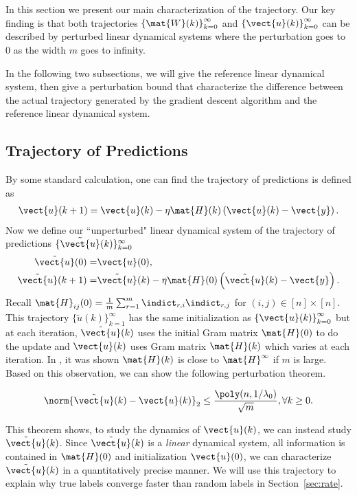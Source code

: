 In this section we present our main characterization of the trajectory.
Our key finding is that both trajectories $\left\{\mat{W}(k)\right\}_{k=0}^\infty$ and $\left\{\vect{u}(k)\right\}_{k=0}^\infty$ can be described by perturbed linear dynamical systems where the perturbation goes to $0$ as the width $m$ goes to infinity.

In the following two subsections, we will give the reference linear dynamical system, then give a perturbation bound that characterize the difference between the actual trajectory generated by the gradient descent algorithm and the reference linear dynamical system.

\subsection{Trajectory of Predictions}
\label{sec:traj_pred}
By some standard calculation, one can find the trajectory of predictions is defined as 
\begin{align*}
	\vect{u}(k+1) = \vect{u}(k) - \eta \mat{H}(k)\left(\vect{u}(k)-\vect{y}\right).
\end{align*}
Now we define our ``unperturbed" linear dynamical system of the trajectory of predictions $\{\tilde{\vect{u}}(k)\}_{k=0}^\infty$
\begin{align}
	\tilde{\vect{u}}(0) = &\vect{u}(0), \nonumber\\
	\tilde{\vect{u}}(k+1) = &\tilde{\vect{u}}(k) - \eta \mat{H}(0)\left(\tilde{\vect{u}}(k)-\vect{y}\right). \label{eqn:u_tilde_dynamics}
\end{align}
Recall $\mat{H}_{ij}(0) = \frac{1}{m}\sum_{r=1}^{m} \indict_{r,i}\indict_{r,j}$ for $(i,j) \in [n] \times [n]$.
This trajectory $\{\tilde{u}(k)\}_{k=1}^{\infty}$ has the same initialization as $\left\{\vect{u}(k)\right\}_{k=0}^\infty$ but at each iteration, $\tilde{\vect{u}}(k)$ uses the initial Gram matrix $\mat{H}(0)$ to do the update and $\vect{u}(k)$ uses Gram matrix $\mat{H}(k)$ which varies at each iteration.
In \cite{du2018provably}, it was shown $\mat{H}(k)$ is close to $\mat{H}^\infty$ if $m$ is large.
Based on this observation, we can show the following perturbation theorem.
\begin{thm}\label{thm:traj_u}
\begin{align}
\norm{\tilde{\vect{u}}(k) - \vect{u}(k)}_2 \le \frac{\poly(n,1/\lambda_0)}{\sqrt{m}}, \forall k \ge 0. \label{eqn:traj_u_perturb}
\end{align}
\end{thm}
This theorem shows, to study the dynamics of $\vect{u}(k)$, we can instead study $\tilde{\vect{u}}(k)$.
Since $\tilde{\vect{u}}(k)$ is a \emph{linear} dynamical system, all information is contained in $\mat{H}(0)$ and initialization $\vect{u}(0)$, we can characterize $\tilde{\vect{u}}(k)$ in a quantitatively precise manner.
We will use this trajectory to explain why true labels converge faster than random labels in Section~\ref{sec:rate}. 






